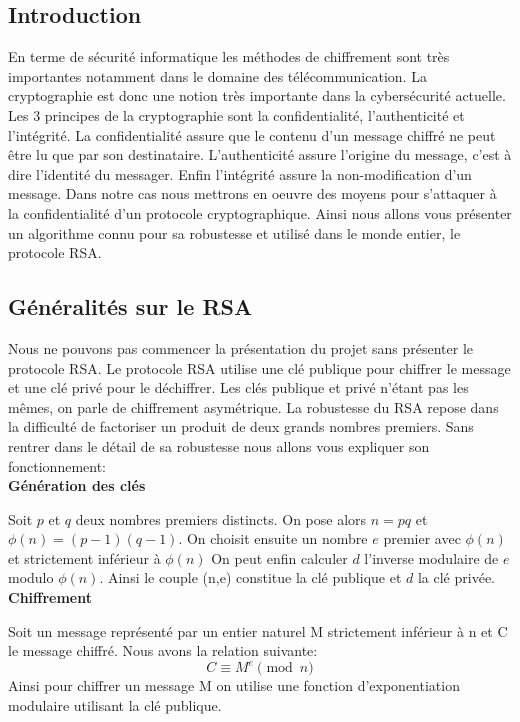 \subsection{Introduction}
En terme de sécurité informatique les méthodes de chiffrement sont très importantes notamment dans le domaine des télécommunication. La cryptographie est donc une notion très importante dans la cybersécurité actuelle. Les 3 principes de la cryptographie sont la confidentialité, l'authenticité et l'intégrité.
La confidentialité assure que le contenu d'un message chiffré ne peut être lu que par son destinataire.
L'authenticité assure l'origine du message, c'est à dire l'identité du messager.
Enfin l'intégrité assure la non-modification d'un message.
Dans notre cas nous mettrons en oeuvre des moyens pour s'attaquer à la confidentialité d'un protocole cryptographique. 
Ainsi nous allons vous présenter un algorithme connu pour sa robustesse et utilisé dans le monde entier, le protocole RSA.
\newpage
\subsection{Généralités sur le RSA}
Nous ne pouvons pas commencer la présentation du projet sans présenter le protocole RSA.
Le protocole RSA utilise une clé publique pour chiffrer le message et une clé privé pour le déchiffrer. Les clés publique et privé n'étant pas les mêmes, on parle de chiffrement asymétrique.
La robustesse du RSA repose dans la difficulté de factoriser un produit de deux grands nombres premiers.
Sans rentrer dans le détail de sa robustesse nous allons vous expliquer son fonctionnement:
\\

\textbf{Génération des clés}


Soit $p$ et $q$ deux nombres premiers distincts. On pose alors $n=pq$ et $\phi(n)=(p-1)(q-1)$.
On choisit ensuite un nombre $e$ premier avec $\phi(n)$ et strictement inférieur à $\phi(n)$
On peut enfin calculer $d$ l'inverse modulaire de $e$ modulo $\phi(n)$.
Ainsi le couple (n,e) constitue la clé publique et $d$ la clé privée.
\\

\textbf{Chiffrement}


Soit un message représenté par un entier naturel M strictement inférieur à n et C le message chiffré.
Nous avons la relation suivante:
\begin{equation}
\label{eq:chiffrement}
C \equiv M^e \pmod{n}
\end{equation}
Ainsi pour chiffrer un message M on utilise une fonction d'exponentiation modulaire utilisant la clé publique.
\\

